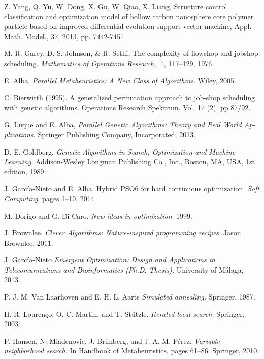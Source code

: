 \begin{thebibliography}{9}
    Z. Yang, Q. Yu, W. Dong, X. Gu, W. Qiao, X. Liang, Structure control classification and optimization model of hollow carbon nanosphere core polymer particle based on improved differential evolution support vector machine, Appl. Math. Model., 37, 2013, pp. 7442-7451

    M. R. Garey, D. S. Johnson, \& R. Sethi, The complexity of flowshop and jobshop scheduling.
    \textit{Mathematics of Operations Research,}.
     1, 117–129, 1976.
    
     E. Alba,
    \textit{Parallel Metaheuristics: A New Class of Algorithms.}
     Wiley, 2005.
    
    C. Bierwirth (1995). 
    A generalized permutation approach to job-shop scheduling with genetic algorithms. 
    Operations Research Spektrum. Vol. 17 (2). pp 87/92. 

    
    G. Luque and E. Alba,
    \textit{Parallel Genetic Algorithms: Theory and Real World Ap-plications.}
    Springer Publishing Company, Incorporated, 2013.

    D. E. Goldberg.
    \textit{Genetic Algorithms in Search, Optimization and Machine Learning}. 
    Addison-Wesley Longman Publishing Co., Inc., Boston, MA, USA, 1st edition, 1989.

    J. García-Nieto and E. Alba. Hybrid PSO6 for hard continuous optimization.
    \textit{Soft Computing}. 
    pages 1–19, 2014

    M. Dorigo and G. Di Caro.
    \textit{New ideas in optimization}. 
    1999.
    
    J. Brownlee.
    \textit{Clever Algorithms: Nature-inspired programming recipes.} 
    Jason Brownlee, 2011.
    
    J. García-Nieto
    \textit{Emergent Optimization: Design and Applications in Telecomunications and Bioinformatics (Ph.D. Thesis).}
    University of Málaga, 2013.
    
    P. J. M. Van Laarhoven and E. H. L. Aarts
    \textit{Simulated annealing.}
    Springer, 1987.

    H. R. Lourenço, O. C. Martin, and T. Stützle.
    \textit{Iterated local search.}
    Springer, 2003.
    
    P. Hansen, N. Mladenovic, J. Brimberg, and J. A. M. Pérez.
    \textit{Variable neighborhood search.} 
    In Handbook of Metaheuristics, pages 61–86. Springer, 2010.


\end{thebibliography}
